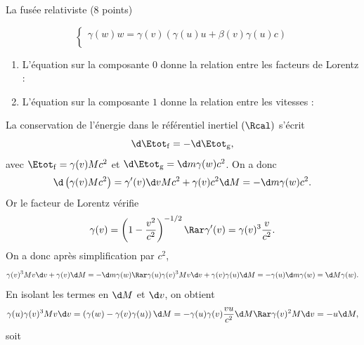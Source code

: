 \begin{exo}[PC][1][devoir]{La fusée relativiste (8 points)}
\begin{quest}
{$$\begin{cases}
        \gamma(w) w = \gamma(v) (\gamma(u) u + \beta(v) \gamma(u) c) \\
      \end{cases}
      $$
      \begin{enumerate}
        \item L'équation sur la composante $0$ donne la relation entre les facteurs de Lorentz :
        \item L'équation sur la composante $1$ donne la relation entre les vitesses :
      \end{enumerate}
    }
    {
    La conservation de l’énergie dans le référentiel inertiel $(\Rcal)$ s’écrit
    $$
    \d \Etot_{\rm f} = -\d \Etot_{\rm g},
    $$
    avec $\Etot_{\rm f} = \gamma(v) M c^2$ et $\d \Etot_{\rm g} = \d m \gamma(w) c^2$. On a donc
    $$
    \d \left( \gamma(v) M c^2 \right) = \gamma'(v) \d v M c^2  + \gamma(v) c^2 \d M = - \d m \gamma(w) c^2.
    $$
Or le facteur de Lorentz vérifie
    $$
    \gamma(v) = \left( 1-\frac{v^2}{c^2} \right)^{-1/2}  \Rar \gamma'(v) = \gamma(v)^3 \frac{v}{c^2}.
    $$
On a donc après simplification par $c^2$,
    $$
    \gamma(v)^3 M v \d v + \gamma(v) \d M = - \d m \gamma(w) \Rar \gamma(u)\gamma(v)^3 M v \d v + \gamma(v)\gamma(u) \d M = - \gamma(u)\d m \gamma(w) = \d M \gamma(w).
    $$
    En isolant les termes en $\d M$ et $\d v$,  on obtient
    $$
    \gamma(u)\gamma(v)^3 M v \d v = \left(  \gamma(w) -\gamma(v)\gamma(u) \right) \d M = - \gamma(u) \gamma(v)  \frac{v u}{c^2} \d M \Rar \gamma(v)^2 M \d v = - u \d M,
    $$
    soit 

}
\end{quest}
\end{exo}
